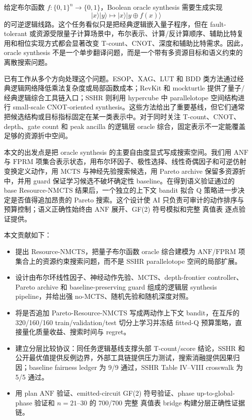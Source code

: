 \documentclass[UTF8,fontset=macnew,11pt]{ctexart}
\newcommand{\method}{Resource-NMCTS}
\newcommand{\anf}{\ensuremath{\mathrm{ANF}}}
\newcommand{\fprm}{\ensuremath{\mathrm{FPRM}}}
\newcommand{\mcts}{\ensuremath{\mathrm{MCTS}}}
\newcommand{\xor}{\ensuremath{\oplus}}
\newcommand{\ttable}{真值表}
\begin{document}
给定布尔函数 $f:\{0,1\}^n\rightarrow\{0,1\}$，Boolean oracle synthesis 需要生成实现
\begin{equation}
  |x\rangle |y\rangle \mapsto |x\rangle |y\xor f(x)\rangle
  \label{eq:oracle}
\end{equation}
的可逆逻辑线路。这个任务看似只是把经典逻辑嵌入量子程序，但在 fault-tolerant 或资源受限量子计算场景中，布尔表示、计算/反计算顺序、辅助比特复用和相位实现方式都会显著改变 T-count、CNOT、深度和辅助比特需求。因此，oracle synthesis 不是一个单步翻译问题，而是一个带有多资源目标和语义约束的离散搜索问题。

已有工作从多个方向处理这个问题。ESOP、XAG、LUT 和 BDD 类方法通过经典逻辑网络降低乘法复杂度或局部函数成本\cite{wille2009bdd,meuli2020ros,meuli2022xag}；RevKit 和 mockturtle 提供了量子/经典逻辑综合工具链入口\cite{soeken2018epfl,revkit,mockturtle}；SSHR 则利用 hypercube 中 parallelotope 空间结构进行 small-scale CNOT-oriented synthesis\cite{zheng2025sshr}。这些方法给出了重要基线，但它们通常把候选结构或目标指标固定在某一类表示中。对于同时关注 T-count、CNOT、depth、gate count 和 peak ancilla 的逻辑层 oracle 综合，固定表示不一定能覆盖足够的资源折中空间。

本文的出发点是把 oracle synthesis 的主要自由度显式写成搜索空间。我们用 \anf{} 与 \fprm{} 项集合表示状态，用布尔环因子、极性选择、线性奇偶因子和可逆仿射变换定义动作，用 \mcts{} 与神经先验搜索候选，用 Pareto archive 保留多资源折中，并用 guard 保证学习候选不破坏确定性 baseline。在得到语义验证通过的 base \method{} 结果后，一个独立的上下文 bandit 拟合 Q 策略进一步决定是否值得追加昂贵的 Pareto 搜索。这个设计使 AI 只负责可审计的动作排序与预算控制；语义正确性始终由 \anf{} 展开、GF(2) 符号模拟和完整 \ttable{} 逐点验证提供。

本文贡献如下：
\begin{itemize}
  \item 提出 \method{}，把量子布尔函数 oracle 综合建模为 \anf{}/\fprm{} 项集合上的资源约束搜索问题，而不是 SSHR parallelotope 空间的局部扩展。
  \item 设计由布尔环线性因子、神经动作先验、\mcts{}、depth-frontier controller、Pareto archive 和 baseline-preserving guard 组成的逻辑层 synthesis pipeline，并给出强 no-\mcts{}、随机先验和随机深度对照。
  \item 将是否追加 Pareto-\method{} 写成两动作上下文 bandit，在互斥的 320/160/160 train/validation/test 切分上学习并冻结 fitted-Q 预算策略，直接量化质量收益、搜索时间与 regret。
  \item 建立分层比较协议：同任务逻辑基线支撑头部 T-count/score 结论，SSHR 和公开最优值提供反例边界，外部工具链提供压力测试，搜索消融提供因果归因；baseline fairness ledger 为 9/9 通过，SSHR Table IV--VIII crosswalk 为 5/5 通过。
  \item 用 plan \anf{} 验证、emitted-circuit GF(2) 符号验证、phase up-to-global-phase 验证和 $n=21$--$30$ 的 700/700 完整 \ttable{} bridge 构建分层正确性证据链。
\end{itemize}
\end{document}
